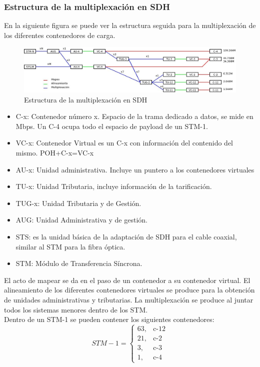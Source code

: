 \subsubsection{Estructura de la multiplexación en SDH}
En la siguiente figura se puede ver la estructura seguida para la multiplexación de los diferentes contenedores de carga.
\begin{figure}[H]
\centering
\includegraphics[width=\textwidth]{Imagen/diamuxSDH.jpg}
\caption{Estructura de la multiplexación en SDH}
\label{}
\end{figure}
\begin{itemize}
	\item C-x: Contenedor número x. Espacio de la trama dedicado a datos, se mide en Mbps. Un C-4 ocupa todo el espacio de payload de un STM-1.
	\item VC-x: Contenedor Virtual es un C-x con información del contenido del mismo. POH+C-x=VC-x
	\item AU-x: Unidad administrativa. Incluye un puntero a los contenedores virtuales
	\item TU-x: Unidad Tributaria, incluye información de la tarificación.
	\item TUG-x: Unidad Tributaria y de Gestión.
	\item AUG: Unidad Administrativa y de gestión.
	\item STS: es la unidad básica de la adaptación de SDH para el cable coaxial, similar al STM para la fibra óptica.
	\item STM: Módulo de Transferencia Síncrona.
\end{itemize}
El acto de mapear se da en el paso de un contenedor a su contenedor virtual. El alineamiento de los diferentes contenedores virtuales se produce para la obtención de unidades administrativas y tributarias. La multiplexación se produce al juntar todos los sistemas menores dentro de los STM.\\
Dentro de un STM-1 se pueden contener los siguientes contenedores:
\[STM-1=
\begin{cases}
63, & \text{c-12}\\
21, & \text{c-2}\\
3, & \text{c-3}\\
1, & \text{c-4}
\end{cases}
\]
